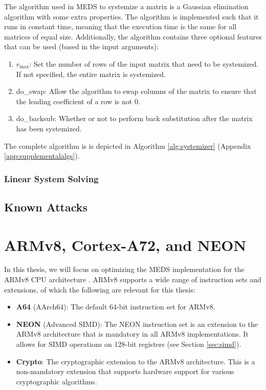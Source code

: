 \documentclass[11pt,a4paper]{report}
\theoremstyle{definition}
\begin{document}
The algorithm used in MEDS to systemize a matrix is a Gaussian elimination algorithm with some extra properties. The algorithm is implemented such that it runs in constant time, meaning that the execution time is the same for all matrices of equal size. Additionally, the algorithm contains three optional features that can be used (based in the input arguments):
\begin{enumerate}
  \item $r_{\text{max}}$: Set the number of rows of the input matrix that need to be systemized. If not specified, the entire matrix is systemized.
  \item do\_swap: Allow the algorithm to swap columns of the matrix to ensure that the leading coefficient of a row is not 0.
  \item do\_backsub: Whether or not to perform back substitution after the matrix has been systemized.
\end{enumerate}
The complete algorithm is is depicted in Algorithm \ref{alg:systemizer} (Appendix \ref{app:supplementalalgs}).

\subsubsection{Linear System Solving}
\label{sec:linearsolving}

\subsection{Known Attacks}

\section{ARMv8, Cortex-A72, and NEON}
\label{sec:armv8}
In this thesis, we will focus on optimizing the MEDS implementation for the ARMv8 CPU architecture \cite{armv8m}. ARMv8 supports a wide range of instruction sets and extensions, of which the following are relevant for this thesis:
\begin{itemize}
  \item \textbf{A64} (AArch64): The default 64-bit instruction set for ARMv8.
  \item \textbf{NEON} (Advanced SIMD): The NEON instruction set is an extension to the ARMv8 architecture that is mandatory in all ARMv8 implementations. It allows for SIMD operations on 128-bit registers (see Section \ref{sec:simd}).
  \item \textbf{Crypto}: The cryptographic extension to the ARMv8 architecture. This is a non-mandatory extension that supports hardware support for various cryptographic algorithms.
\end{itemize}
\end{document}

